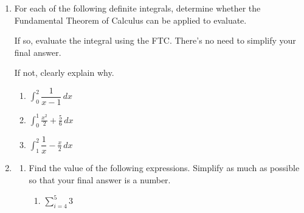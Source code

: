 \documentclass[11pt]{article}
\begin{document}
\begin{enumerate}

\newpage


\item For each of the following definite integrals, determine whether the Fundamental Theorem of Calculus can be applied to evaluate. 

If so, evaluate the integral using the FTC. There's no need to simplify your final answer.

If not, clearly explain why.

\begin{enumerate}
    \item $\displaystyle\int_{0}^{2}\dfrac{1}{x-1}\, dx$

    \vfill

    \item $\displaystyle\int_{0}^1  \frac{x^2}{2}+ \frac{5}{6}\, dx$

    \vfill


   \item $\displaystyle\int_{1}^2\dfrac{1}{x}- \frac{x}{2}\, dx$

    \vfill
\end{enumerate}


\newpage


\item 

\begin{enumerate}
    \item Find the value of the following expressions. Simplify as much as possible so that your final answer is a number.

    \begin{enumerate}
        \item[(i)] $\displaystyle\sum_{i=4}^5 3$


\end{enumerate}
\end{enumerate}
\end{enumerate}
\end{document}
